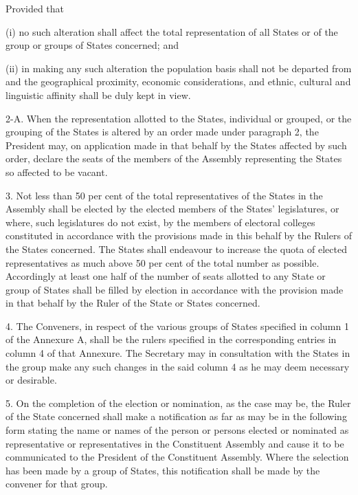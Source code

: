 Provided that\textemdash{} 



(i) no such alteration shall affect the total representation of all States or of the group or groups of States concerned; and 



(ii) in making any such alteration the population basis shall not be departed from and the geographical proximity, economic considerations, and ethnic, cultural and linguistic affinity shall be duly kept in view.



2-A. When the representation allotted to the States, individual or grouped, or the grouping of the States is altered by an order made under paragraph 2, the President may, on application made in that behalf by the States affected by such order, declare the seats of the members of the Assembly representing the States so affected to be vacant.



3. Not less than 50 per cent of the total representatives of the States in the Assembly shall be elected by the elected members of the States\textquoteright{} legislatures, or where, such legislatures do not exist, by the members of electoral colleges constituted in accordance with the provisions made in this behalf by the Rulers of the States concerned. The States shall endeavour to increase the quota of elected representatives as much above 50 per cent of the total number as possible. Accordingly at least one half of the number of seats allotted to any State or group of States shall be filled by election in accordance with the provision made in that behalf by the Ruler of the State or States concerned. 



4. The Conveners, in respect of the various groups of States specified in column 1 of the Annexure A, shall be the rulers specified in the corresponding entries in column 4 of that Annexure. The Secretary may in consultation with the States in the group make any such changes in the said column 4 as he may deem necessary or desirable. 



5. On the completion of the election or nomination, as the case may be, the Ruler of the State concerned shall make a notification as far as may be in the following form stating the name or names of the person or persons elected or nominated as representative or representatives in the Constituent Assembly and cause it to be communicated to the President of the Constituent Assembly. Where the selection has been made by a group of States, this notification shall be made by the convener for that group.



